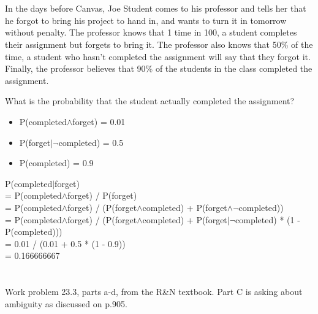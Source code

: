 \documentclass[paper=a4, fontsize=11pt]{scrartcl} %
\begin{document}

\section{}

\begin{fancyquotes}
  In the days before Canvas, Joe Student comes to his professor and
  tells her that he forgot to bring his project to hand in, and wants
  to turn it in tomorrow without penalty. The professor knows that 1
  time in 100, a student completes their assignment but forgets to
  bring it. The professor also knows that 50\% of the time, a student
  who hasn't completed the assignment will say that they forgot
  it. Finally, the professor believes that 90\% of the students in the
  class completed the assignment.

  What is the probability that the student actually completed the
  assignment?
\end{fancyquotes}
\begin{itemize}
\item P(completed$\land$forget) = 0.01
\item P(forget$|$$\lnot$completed) = 0.5
\item P(completed) = 0.9
\end{itemize}

P(completed$|$forget)\\
= P(completed$\land$forget) / P(forget)\\
= P(completed$\land$forget) / (P(forget$\land$completed) +
P(forget$\land$$\lnot$completed))\\
= P(completed$\land$forget) / (P(forget$\land$completed) +
P(forget$|$$\lnot$completed) * (1 - P(completed)))\\
= 0.01 / (0.01 + 0.5 * (1 - 0.9))\\
= 0.166666667


\section{}

\begin{fancyquotes}
  Work problem 23.3, parts a-d, from the R\&N textbook. Part C is
  asking about ambiguity as discussed on p.905.
\end{fancyquotes}
\end{document}
